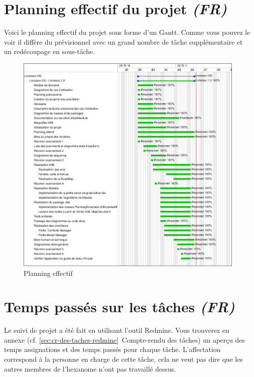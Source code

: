 \documentclass[paper=a4,fontsize=11pt]{report}
\numberwithin{equation}{section}		%
\numberwithin{figure}{section}		%
\numberwithin{table}{section}		%
\renewcommand{\it}[1]{\textit{#1}}
\begin{document}
\section{Planning effectif du projet \it{(FR)}}
\label{sec:planning-effectif-du-projet}

Voici le planning effectif du projet sous forme d'un Gantt. Comme vous pouvez le voir il diffère du prévisionnel avec un grand nombre de tâche supplémentaire et un redécoupage en sous-tâche.

\begin{figure}[H]
\centering
\includegraphics[scale=0.5,angle=0]{redmine/gantt-real.png}
\caption{Planning effectif}
\end{figure}

\section{Temps passés sur les tâches \it{(FR)}}
\label{sec:temps-passes-sur-les-taches}

Le suivi de projet a été fait en utilisant l'outil Redmine. Vous trouverez en annexe (cf. \ref{sec:cr-des-taches-redmine}~Compte-rendu des tâches) un aperçu des temps assignations et des temps passés pour chaque tâche. L'affectation correspond à la personne en charge de cette tâche, cela ne veut pas dire que les autres membres de l'hexanome n'ont pas travaillé dessus.
\end{document}
